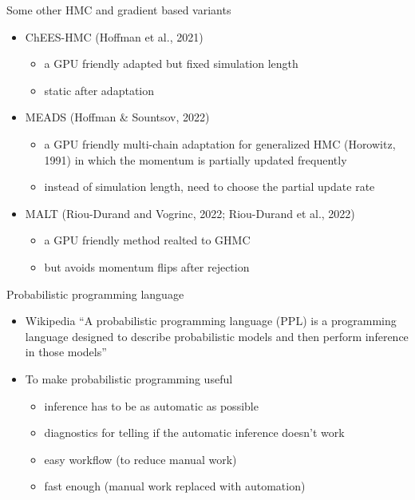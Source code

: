 \documentclass[finnish,english,t]{beamer}
\begin{document}
\begin{frame}{Some other HMC and gradient based variants}

  \begin{itemize}
  \item ChEES-HMC (Hoffman et al., 2021)
    \begin{itemize}
    \item a GPU friendly adapted but fixed simulation length
    \item static after adaptation
    \end{itemize}
  \item MEADS (Hoffman \& Sountsov, 2022)
    \begin{itemize}
    \item a GPU friendly multi-chain adaptation for generalized HMC (Horowitz, 1991) in
      which the momentum is partially updated frequently
    \item instead of simulation length, need to choose the partial
      update rate
    \end{itemize}
  \item MALT (Riou-Durand and Vogrinc, 2022; Riou-Durand et al., 2022)
    \begin{itemize}
    \item a GPU friendly method realted to GHMC
    \item but avoids momentum flips after rejection
    \end{itemize}
  \end{itemize}
  
\end{frame}

\begin{frame}{Probabilistic programming language}
  
  \begin{itemize}
  \item Wikipedia ``A probabilistic programming language (PPL) is a
    programming language designed to describe probabilistic models
    and then perform inference in those models''
    \pause
  \item To make probabilistic programming useful
    \begin{itemize}
    \item inference has to be as automatic as possible
    \item diagnostics for telling if the automatic inference doesn't work
    \item easy workflow (to reduce manual work)
    \item fast enough (manual work replaced with automation)
    \end{itemize}
  \end{itemize}
\end{frame}
\end{document}
